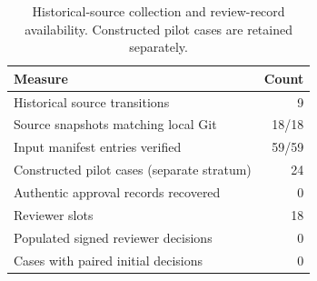 \begin{table}[ht]
\centering
\caption{Historical-source collection and review-record availability. Constructed pilot cases are retained separately.}
\label{tab:historical-collection}
\begin{tabular}{lr}
\hline
Measure & Count \\
\hline
Historical source transitions & 9 \\
Source snapshots matching local Git & 18/18 \\
Input manifest entries verified & 59/59 \\
Constructed pilot cases (separate stratum) & 24 \\
Authentic approval records recovered & 0 \\
Reviewer slots & 18 \\
Populated signed reviewer decisions & 0 \\
Cases with paired initial decisions & 0 \\
\hline
\end{tabular}
\end{table}
